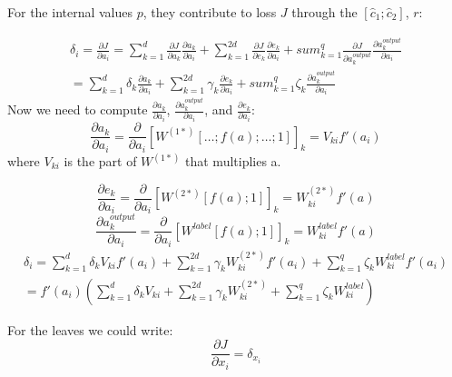 \documentclass[twoside,12pt]{article}
\begin{document}
For the internal values $p$, they contribute to loss $J$ through the $[\hat{c}_1;\hat{c}_2]$, $r$:

\begin{align}
\delta_i=\frac{\partial J}{\partial a_i}=\sum_{k=1}^{d}\frac{\partial J}{\partial a_k}\frac{\partial a_k}{\partial a_i}+\sum_{k=1}^{2d}\frac{\partial J}{\partial e_k}\frac{\partial e_k}{\partial a_i}+sum_{k=1}^{q}\frac{\partial J}{\partial a^{output}_k}\frac{\partial a^{output}_k}{\partial a_i} \\
= \sum_{k=1}^{d}\delta_k\frac{\partial a_k}{\partial a_i}+\sum_{k=1}^{2d}\gamma_k\frac{\partial e_k}{\partial a_i}+sum_{k=1}^{q}\zeta_k\frac{\partial a^{output}_k}{\partial a_i}
\end{align}
Now we need to compute $\frac{\partial a_k}{\partial a_i}$, $\frac{\partial a^{output}_k}{\partial a_i}$, and $\frac{\partial e_k}{\partial a_i}$:
\begin{equation}
\frac{\partial a_k}{\partial a_i}=\frac{\partial}{\partial a_i}[W^{(1*)}[\ldots;f(a);\ldots;1]]_k=V_{ki}f'(a_i)
\end{equation}
where $V_{ki}$ is the part of $W^{(1*)}$ that multiplies a.

\begin{equation}
\frac{\partial e_k}{\partial a_i}=\frac{\partial}{\partial a_i}[W^{(2*)}[f(a);1]]_k = W^{(2*)}_{ki}f'(a)
\end{equation}
\begin{equation}
\frac{\partial a^{output}_k}{\partial a_i}=\frac{\partial }{\partial a_i}[W^{label}[f(a);1]]_k=W^{label}_{ki}f'(a)
\end{equation}
\begin{align}
\delta_i=\sum_{k=1}^{d}\delta_kV_{ki}f'(a_i)+\sum_{k=1}^{2d}\gamma_kW^{(2*)}_{ki}f'(a_i)+\sum_{k=1}^q \zeta_k W^{label}_{ki}f'(a_i)\\
=f'(a_i)(\sum_{k=1}^{d}\delta_kV_{ki}+\sum_{k=1}^{2d}\gamma_kW^{(2*)}_{ki}+\sum_{k=1}^q \zeta_k W^{label}_{ki})
\end{align}

For the leaves we could write:
\begin{equation}
\frac{\partial J}{\partial x_i}=\delta_{x_i
}\end{equation}
\end{document}
